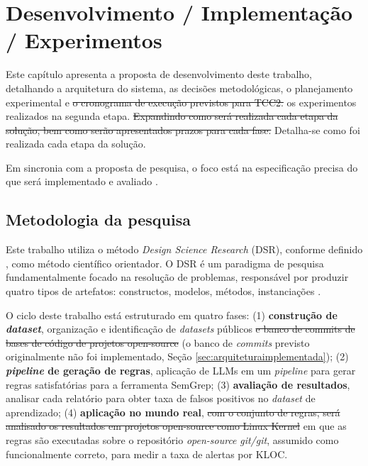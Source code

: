 \documentclass[
    12pt,                %
    openright,           %
    oneside,             %
    a4paper,             %
    english,             %
    brazil               %
]{abntex2}
\newcommand{\antigo}[1]{\sout{#1}}
\newcommand{\novo}[1]{{\color{red}#1}}
\begin{document}
\chapter{Desenvolvimento / Implementação / Experimentos}
\label{cap:desenvolvimento}
\par
Este capítulo apresenta a proposta de desenvolvimento deste trabalho, detalhando a arquitetura do sistema, as decisões metodológicas, o planejamento experimental e \antigo{o cronograma de execução previstos para TCC2. } \novo{os experimentos realizados na segunda etapa. }
\antigo{Expandindo como será realizada cada etapa da solução, bem como serão apresentados prazos para cada fase.} \novo{Detalha-se como foi realizada cada etapa da solução.}
\par
Em sincronia com a proposta de pesquisa, o foco está na especificação precisa do que será implementado e avaliado \cite{Wazlawick2020}.

\section{Metodologia da pesquisa}
\label{sec:metodologia_pesquisa}
\par
Este trabalho utiliza o método \textit{Design Science Research} (DSR), conforme definido , como método científico orientador.
O DSR é um paradigma de pesquisa fundamentalmente focado na resolução de problemas, responsável por produzir quatro tipos de artefatos: constructos, modelos, métodos, instanciações \cite{hevner2004design}.
\par
O ciclo deste trabalho está estruturado em quatro fases:
(1) \textbf{construção de \textit{dataset}}, organização e identificação de \textit{datasets} públicos\antigo{ e banco de commits de bases de código de projetos open-source} \novo{ (o banco de \textit{commits} previsto originalmente não foi implementado, Seção \ref{sec:arquiteturaimplementada})};
(2) \textbf{\textit{pipeline} de geração de regras}, aplicação de LLMs em um \textit{pipeline} para gerar regras satisfatórias para a ferramenta SemGrep;
(3) \textbf{avaliação de resultados}, analisar cada relatório para obter taxa de falsos positivos no \textit{dataset} de aprendizado;
(4) \textbf{aplicação no mundo real}, \antigo{com o conjunto de regras, será analisado os resultados em projetos open-source como Linux Kernel} \novo{em que as regras são executadas sobre o repositório \textit{open-source} \textit{git/git}, assumido como funcionalmente correto, para medir a taxa de alertas por KLOC}.
\end{document}

